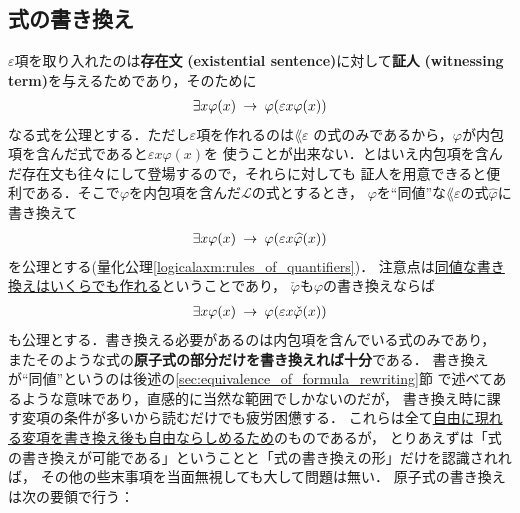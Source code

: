 \subsection{式の書き換え}
\label{subsec:formula_rewriting}
	$\varepsilon$項を取り入れたのは{\bf 存在文}
	{\bf (existential sentence)}に対して{\bf 証人}
	{\bf (witnessing term)}を与えるためであり，そのために
	\begin{align}
		\exists x \varphi(x) \hspace{0.25em}\rightarrow\hspace{0.25em} \varphi(\varepsilon x \varphi(x))
	\end{align}
	なる式を公理とする．ただし$\varepsilon$項を作れるのは$\lang{\varepsilon}$
	の式のみであるから，$\varphi$が内包項を含んだ式であると$\varepsilon x \varphi(x)$を
	使うことが出来ない．とはいえ内包項を含んだ存在文も往々にして登場するので，それらに対しても
	証人を用意できると便利である．そこで$\varphi$を内包項を含んだ$\mathcal{L}$の式とするとき，
	$\varphi$を``同値''な$\lang{\varepsilon}$の式$\widehat{\varphi}$に書き換えて
	\begin{align}
		\exists x \varphi(x) \hspace{0.25em}\rightarrow\hspace{0.25em} \varphi(\varepsilon x \widehat{\varphi}(x))
	\end{align}
	を公理とする(量化公理\ref{logicalaxm:rules_of_quantifiers})．
	注意点は\underline{同値な書き換えはいくらでも作れる}ということであり，
	$\check{\varphi}$も$\varphi$の書き換えならば
	\begin{align}
		\exists x \varphi(x) \hspace{0.25em}\rightarrow\hspace{0.25em} \varphi(\varepsilon x \check{\varphi}(x))
	\end{align}
	も公理とする．書き換える必要があるのは内包項を含んでいる式のみであり，
	またそのような式の{\bf 原子式の部分だけを書き換えれば十分}である．
	書き換えが``同値''というのは後述の\ref{sec:equivalence_of_formula_rewriting}節
	で述べてあるような意味であり，直感的に当然な範囲でしかないのだが，
	書き換え時に課す変項の条件が多いから読むだけでも疲労困憊する．
	これらは全て\underline{自由に現れる変項を書き換え後も自由ならしめるため}のものであるが，
	とりあえずは「式の書き換えが可能である」ということと「式の書き換えの形」だけを認識されれば，
	その他の些末事項を当面無視しても大して問題は無い．
	原子式の書き換えは次の要領で行う：
	
